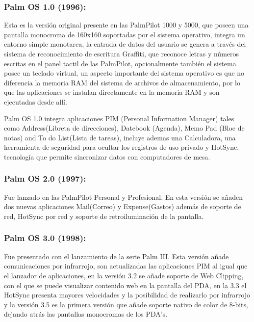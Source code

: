 \subsubsection*{Palm OS 1.0 (1996):}
Esta es la versión original presente en las PalmPilot 1000 y 5000, que poseen una pantalla monocroma de 160x160 soportadas por el sistema operativo, integra un entorno simple 
monotarea, la entrada de datos del usuario se genera a través del sistema de reconocimiento de escritura Graffiti, que reconoce letras y números escritas en el panel tactil de 
las PalmPilot, opcionalmente también el sistema posee un teclado virtual, un aspecto importante del sistema operativo es que no diferencia la memoria RAM del sistema de archivos 
de almacenamiento, por lo que las aplicaciones se instalan directamente en la memoria RAM y son ejecutadas desde allí.

Palm OS 1.0 integra aplicaciones PIM (Personal Information Manager) tales como Address(Libreta de direcciones), Datebook (Agenda), Memo Pad (Bloc de notas) and To do List(Lista 
de tareas), incluye ademas una Calculadora, una herramienta de seguridad para ocultar los registros de uso privado y HotSync, tecnología que permite sincronizar datos con 
computadores de mesa.

\subsubsection*{Palm OS 2.0 (1997):}
Fue lanzado en las PalmPilot Personal y Profesional. En esta versión se añaden dos nuevas aplicaciones Mail(Correo) y Expense(Gastos) además de soporte de red, HotSync por red y
soporte de retroiluminación de la pantalla.

\subsubsection*{Palm OS 3.0 (1998):}
Fue presentado con el lanzamiento de la serie Palm III. Esta versión añade comunicaciones por infrarrojo, son actualizadas las aplicaciones PIM al igual que el lanzador de 
aplicaciones, en la versión 3.2 se añade soporte de Web Clipping, con el que se puede visualizar contenido web en la pantalla del PDA, en la 3.3 el HotSync presenta mayores 
velocidades y la posibilidad de realizarlo por infrarrojo y la versión 3.5 es la primera versión que añade soporte nativo de color de 8-bits, dejando atrás las pantallas 
monocromas de los PDA’s.

